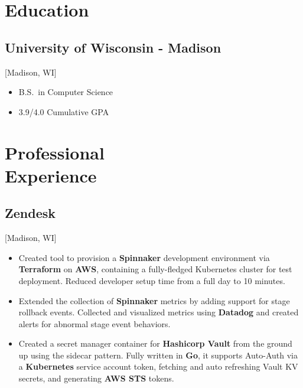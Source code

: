 \documentclass{mycv}
\begin{document}
\maketitle
\section{Education}
\subsection{University of Wisconsin - Madison}[Madison, WI]
\begin{itemize}[label={}]
  \item B.S.\ in Computer Science 
  \item 3.9/4.0 Cumulative GPA
\end{itemize}

\section{Professional \\ Experience}

\subsection{Zendesk}[Madison, WI]
\begin{positions}
\end{positions}
\begin{itemize}
\iffalse
  \item {
     Collaborated closely with local and global team members to build large scale, efficient, and safe \textbf{CI/CD} pipelines that deploy to over dozens of servers globally for 300 million end users.
  }
\fi
  \item {
  Created tool to provision a \textbf{Spinnaker} development environment via \textbf{Terraform} on \textbf{AWS}, containing a fully-fledged Kubernetes cluster for test deployment. Reduced developer setup time from a full day to 10 minutes. 
  }
  \item {
  Extended the collection of \textbf{Spinnaker} metrics by adding support for stage rollback events. Collected and visualized metrics using \textbf{Datadog} and created alerts for abnormal stage event behaviors. 
  }
  \item {
  Created a secret manager container for \textbf{Hashicorp Vault} from the ground up using the sidecar pattern. Fully written in \textbf{Go}, it supports Auto-Auth via a \textbf{Kubernetes} service account token, fetching and auto refreshing Vault KV secrets, and generating \textbf{AWS STS} tokens.
  }
 \end{itemize}
  
\end{document}
